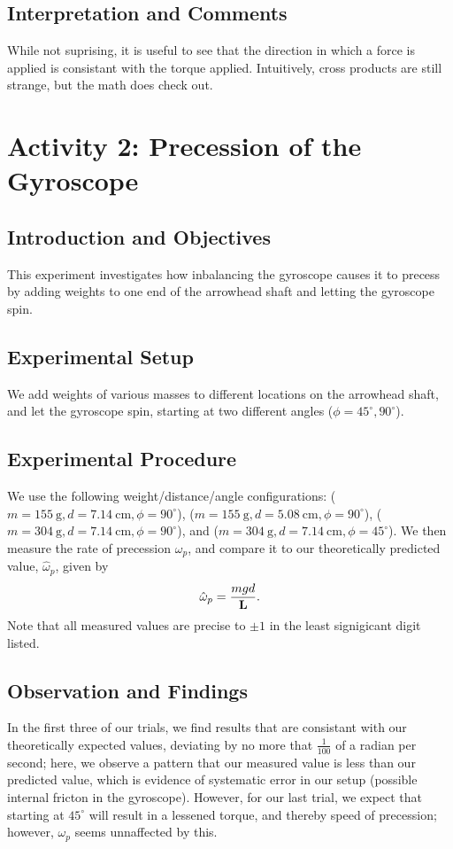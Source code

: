 \documentclass[12pt]{amsart}
\begin{document}
			\subsection*{Interpretation and Comments}
			While not suprising, it is useful to see that the direction in which a force is applied is consistant with the torque applied. Intuitively, cross products are still strange, but the math does check out.
	
		\section*{Activity 2: Precession of the Gyroscope}
			\subsection*{Introduction and Objectives}
			This experiment investigates how inbalancing the gyroscope causes it to precess by adding weights to one end of the arrowhead shaft and letting the gyroscope spin.
			\subsection*{Experimental Setup}
			We add weights of various masses to different locations on the arrowhead shaft, and let the gyroscope spin, starting at two different angles ($\phi = 45^\circ, 90^\circ$).
			\subsection*{Experimental Procedure}
			We use the following weight/distance/angle configurations: ($m=\SI{155}{\gram}, d=\SI{7.14}{\centi\meter},\phi=90^\circ$), ($m=\SI{155}{\gram}, d=\SI{5.08}{\centi\meter},\phi=90^\circ$), ($m=\SI{304}{\gram}, d=\SI{7.14}{\centi\meter},\phi=90^\circ$), and ($m=\SI{304}{\gram}, d=\SI{7.14}{\centi\meter},\phi=45^\circ$). We then measure the rate of precession $\omega_p$, and compare it to our theoretically predicted value, $\hat{\omega}_p$, given by 
			\[ \hat{\omega}_p = \frac{mgd}{\vb{L}}. \] Note that all measured values are precise to $\pm1$ in the least signigicant digit listed.
			\subsection*{Observation and Findings}
			In the first three of our trials, we find results that are consistant with our theoretically expected values, deviating by no more that $\frac{1}{100}$ of a radian per second; here, we observe a pattern that our measured value is less than our predicted value, which is evidence of systematic error in our setup (possible internal fricton in the gyroscope). However, for our last trial, we expect that starting at $45^\circ$ will result in a lessened torque, and thereby speed of precession; however, $\omega_p$ seems unnaffected by this.
	
\end{document}
